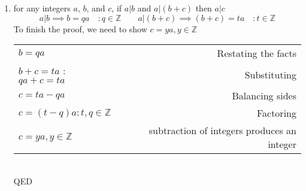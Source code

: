 \documentclass[a4paper,11pt]{article}
\begin{document}
\begin{enumerate}
\begin{enumerate}
  \item for any integers $a$, $b$, and $c$, if $a | b$ and $a | (b+c)$ then $a | c$
  \[a | b \implies b = qa \quad : q \in \mathbb{Z} \qquad a | (b+c) \implies (b+c) = ta \quad :  t \in \mathbb{Z}\]
  To finish the proof, we need to show $c = ya, y \in \mathbb{Z}$ \\
  \begin{tabular}{l | r}
  $b = qa$ & Restating the facts \\
  $b+c = ta$ : $qa+c = ta$ & Substituting \\
  $c = ta-qa$ & Balancing sides \\
  $c = (t-q)a : t,q \in \mathbb{Z}$ & Factoring \\
  $c = ya, y \in \mathbb{Z}$ & subtraction of integers produces an integer \\
  \end{tabular} \\
  QED
  \end{enumerate}





\end{enumerate}
\end{document}
